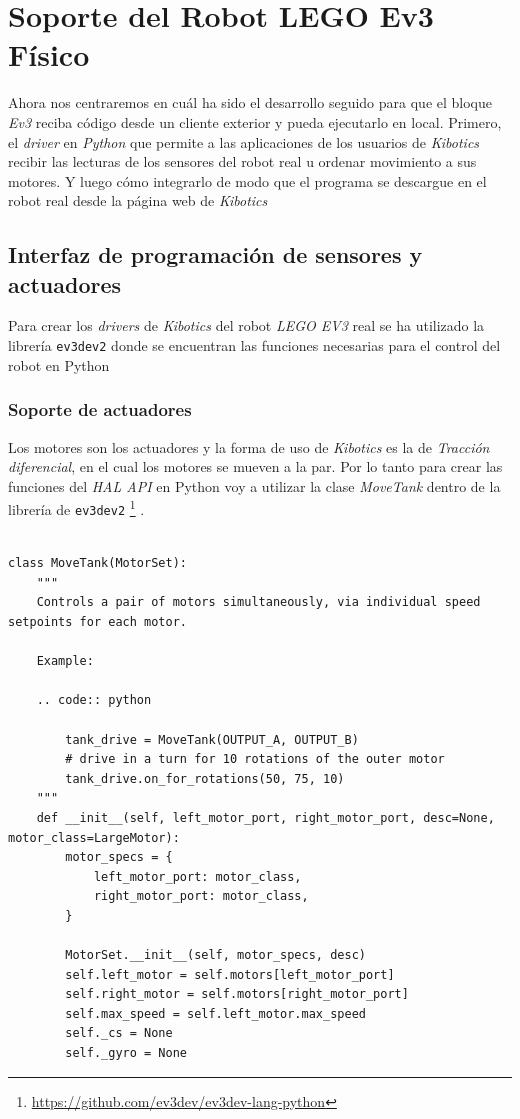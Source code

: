 \chapter{Soporte del Robot LEGO Ev3 Físico}
Ahora nos centraremos en cuál ha sido el desarrollo seguido para que el bloque \textit{Ev3} reciba código desde un cliente exterior y pueda ejecutarlo en local. Primero, el \textit{driver} en \textit{Python} que permite a las aplicaciones de los usuarios de \textit{Kibotics} recibir las lecturas de los sensores del robot real u ordenar movimiento a sus motores. Y luego cómo integrarlo de modo que el programa se descargue en el robot real desde la página web de \textit{Kibotics}

\section{Interfaz de programación de sensores y actuadores}
\label{sec:interfazfisico}
Para crear los \textit{drivers} de \textit{Kibotics} del robot \textit{LEGO EV3} real se ha utilizado la librería \texttt{ev3dev2} donde se encuentran las funciones necesarias para el control del robot en Python 

\subsection{Soporte de actuadores}
Los motores son los actuadores y la forma de uso de \textit{Kibotics} es la de \textit{Tracción diferencial}, en el cual los motores se mueven a la par. Por lo tanto para crear las funciones  del \textit{HAL API} en Python voy a utilizar la clase \textit{MoveTank} dentro de la librería de \texttt{ev3dev2} \footnote{\url{https://github.com/ev3dev/ev3dev-lang-python}} .
 
\begin{lstlisting}[frame=single,breaklines=true, label=Clase MoveTank caption=Clase MoveTank,  captionpos=b]

class MoveTank(MotorSet):
    """
    Controls a pair of motors simultaneously, via individual speed setpoints for each motor.

    Example:

    .. code:: python

        tank_drive = MoveTank(OUTPUT_A, OUTPUT_B)
        # drive in a turn for 10 rotations of the outer motor
        tank_drive.on_for_rotations(50, 75, 10)
    """
    def __init__(self, left_motor_port, right_motor_port, desc=None, motor_class=LargeMotor):
        motor_specs = {
            left_motor_port: motor_class,
            right_motor_port: motor_class,
        }

        MotorSet.__init__(self, motor_specs, desc)
        self.left_motor = self.motors[left_motor_port]
        self.right_motor = self.motors[right_motor_port]
        self.max_speed = self.left_motor.max_speed
        self._cs = None
        self._gyro = None
\end{lstlisting}

